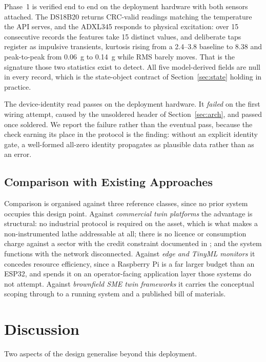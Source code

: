 \documentclass[conference]{IEEEtran}
\begin{document}
Phase~1 is verified end to end on the deployment hardware with both sensors
attached. The DS18B20 returns CRC-valid readings matching the temperature
the API serves, and the ADXL345 responds to physical excitation: over 15
consecutive records the features take 15 distinct values, and deliberate
taps register as impulsive transients, kurtosis rising from a 2.4--3.8
baseline to 8.38 and peak-to-peak from 0.06~g to 0.14~g while RMS barely
moves. That is the signature those two statistics exist to detect. All five
model-derived fields are null in every record, which is the state-object
contract of Section~\ref{sec:state} holding in practice.

The device-identity read passes on the deployment hardware. It \emph{failed}
on the first wiring attempt, caused by the unsoldered header of
Section~\ref{sec:arch}, and passed once soldered. We report the failure
rather than the eventual pass, because the check earning its place in the
protocol is the finding: without an explicit identity gate, a well-formed
all-zero identity propagates as plausible data rather than as an error.

\subsection{Comparison with Existing Approaches}

Comparison is organised against three reference classes, since no prior
system occupies this design point. Against \emph{commercial twin platforms}
the advantage is structural: no industrial protocol is required on the
asset, which is what makes a non-instrumented lathe addressable at all;
there is no licence or consumption charge against a sector with the credit
constraint documented in \cite{b37}; and the system functions with the
network disconnected. Against \emph{edge and TinyML monitors}
\cite{b16,b17,b20} it concedes resource efficiency, since a Raspberry Pi is
a far larger budget than an ESP32, and spends it on an operator-facing
application layer those systems do not attempt. Against \emph{brownfield SME
twin frameworks} \cite{b5} it carries the conceptual scoping through to a
running system and a published bill of materials.

\section{Discussion}

Two aspects of the design generalise beyond this deployment.
\end{document}
